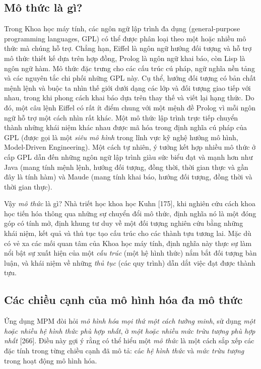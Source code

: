 \subsection{Mô thức là gì?}
Trong Khoa học máy tính, các ngôn ngữ lập trình đa dụng (general-purpose programming languages, GPL) có thể được phân loại theo một hoặc nhiều mô thức mà chúng hỗ trợ. Chẳng hạn, Eiffel là ngôn ngữ hướng đối tượng và hỗ trợ mô thức thiết kế dựa trên hợp đồng, Prolog là ngôn ngữ khai báo, còn Lisp là ngôn ngữ hàm. Mô thức đặc trưng cho các cấu trúc cú pháp, ngữ nghĩa nền tảng và các nguyên tắc chi phối những GPL này. Cụ thể, hướng đối tượng có bản chất mệnh lệnh và buộc ta nhìn thế giới dưới dạng các lớp và đối tượng giao tiếp với nhau, trong khi phong cách khai báo dựa trên thay thế và viết lại hạng thức. Do đó, một câu lệnh Eiffel có rất ít điểm chung với một mệnh đề Prolog vì mỗi ngôn ngữ hỗ trợ một cách nhìn rất khác. Một mô thức lập trình trực tiếp chuyển thành những khái niệm khác nhau được mã hóa trong định nghĩa cú pháp của GPL (được gọi là một \emph{siêu mô hình} trong lĩnh vực kỹ nghệ hướng mô hình, Model-Driven Engineering). Một cách tự nhiên, ý tưởng kết hợp nhiều mô thức ở cấp GPL dẫn đến những ngôn ngữ lập trình giàu sức biểu đạt và mạnh hơn như Java (mang tính mệnh lệnh, hướng đối tượng, đồng thời, thời gian thực và gần đây là tính hàm) và Maude (mang tính khai báo, hướng đối tượng, đồng thời và thời gian thực).

Vậy \emph{mô thức} là gì? Nhà triết học khoa học Kuhn [175], khi nghiên cứu cách khoa học tiến hóa thông qua những sự chuyển đổi mô thức, định nghĩa nó là một đóng góp có tính mở, định khung tư duy về một đối tượng nghiên cứu bằng những khái niệm, kết quả và thủ tục tạo cấu trúc cho các thành tựu tương lai. Mặc dù có vẻ xa các mối quan tâm của Khoa học máy tính, định nghĩa này thực sự làm nổi bật sự xuất hiện của một \emph{cấu trúc} (một hệ hình thức) nắm bắt đối tượng bàn luận, và khái niệm về những \emph{thủ tục} (các quy trình) dẫn dắt việc đạt được thành tựu.

\subsection{Các chiều cạnh của mô hình hóa đa mô thức}
Ứng dụng MPM đòi hỏi \emph{mô hình hóa mọi thứ một cách tường minh}, sử dụng \emph{một hoặc nhiều hệ hình thức phù hợp nhất}, ở \emph{một hoặc nhiều mức trừu tượng phù hợp nhất} [266]. Điều này gợi ý rằng có thể hiểu một \emph{mô thức} là một cách sắp xếp các đặc tính trong từng chiều cạnh đã mô tả: các \emph{hệ hình thức} và \emph{mức trừu tượng} trong hoạt động mô hình hóa.

